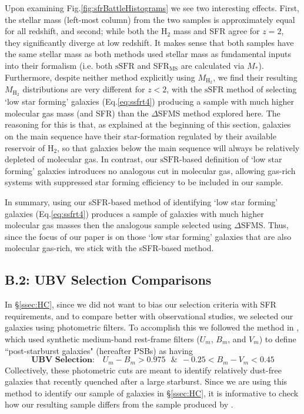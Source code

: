 \documentclass[twocolumn, linenumbers]{aastex631}
\newcommand{\hh}{\text{H}_2}
\newcommand{\mhh}{M_{\text{H}_2}}
\newcommand{\ssfr}{\text{sSFR}}
\newcommand{\eq}{Eq.\hspace{.2em}}
\renewcommand{\fig}{Fig.\hspace{.2em}}
\begin{document}
Upon examining \fig\ref{fig:sfrBattleHistograms} we see two interesting effects.  First, the stellar mass (left-most column) from the two samples is approximately equal for all redshift, and second; while both the $\hh$ mass and SFR agree for $z=2$, they significantly diverge at low redshift.  It makes sense that both samples have the same stellar mass as both methods used stellar mass as fundamental inputs into their formalism (i.e. both $\ssfr$ and SFR$_{\text{MS}}$ are calculated via $M_*$).  Furthermore, despite neither method explicitly using $\mhh$, we find their resulting $\mhh$ distributions are very different for $z<2$, with the $\ssfr$ method of selecting `low star forming' galaxies (\eq\ref{eq:ssfrt4}) producing a sample with much higher molecular gas mass (and SFR) than the $\Delta$SFMS method explored here.  The reasoning for this is that, as explained at the beginning of this section, galaxies on the main sequence have their star-formation regulated by their available reservoir of $\hh$, so that galaxies below the main sequence will always be relatively depleted of molecular gas.  In contrast, our $\ssfr$-based definition of `low star forming' galaxies introduces no analogous cut in molecular gas, allowing gas-rich systems with suppressed star forming efficiency to be included in our sample.  

In summary, using our sSFR-based method of identifying `low star forming' galaxies (\eq\ref{eq:ssfrt4}) produces a sample of galaxies with much higher molecular gas masses then the analogous sample selected using $\Delta$SFMS.  Thus, since the focus of our paper is on those `low star forming' galaxies that are also molecular gas-rich, we stick with the sSFR-based method.

\subsection{B.2: UBV Selection Comparisons}
\label{app:ubv}
In \S\ref{ssec:HC}, since we did not want to bias our selection criteria with SFR requirements, and to compare better with observational studies, we selected our galaxies using photometric filters.  To accomplish this we followed the method in \cite{suessSquiggle}, which used synthetic medium-band rest-frame filters ($U_m$, $B_m$, and $V_m$) to define ``post-starburst galaxies" (hereafter PSBs) as having
\begin{equation}
\textbf{UBV Selection:}\quad U_m-B_m>0.975\ \ \ \&\ \ -0.25<B_m-V_m<0.45
\label{eq:UBVSelect}
\end{equation}
Collectively, these photometric cuts are meant to identify relatively dust-free galaxies that recently quenched after a large starburst.  Since we are using this method to identify our sample of galaxies in \S\ref{ssec:HC}, it is informative to check how our resulting sample differs from the sample produced by \cite{suessSquiggle}.
\end{document}
